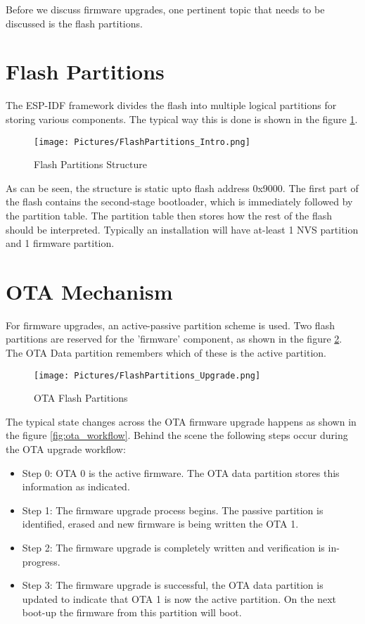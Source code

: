 \documentclass[main.tex]{subfiles}
\begin{document}
Before we discuss firmware upgrades, one pertinent topic that needs to be discussed is the flash partitions.

\section{Flash Partitions}
The ESP-IDF framework divides the flash into multiple logical partitions for storing various components. The typical way this is done is shown in the figure \ref{fig:flash_parts}.
\begin{figure}[h!]
    \centering
    \texttt{[image: Pictures/FlashPartitions\_Intro.png]}
    \caption{Flash Partitions Structure}
    \label{fig:flash_parts}
\end{figure}

As can be seen, the structure is static upto flash address 0x9000. The first part of the flash contains the second-stage bootloader, which is immediately followed by the partition table. The partition table then stores how the rest of the flash should be interpreted. Typically an installation will have at-least 1 NVS partition and 1 firmware partition.

\section{OTA Mechanism}
For firmware upgrades, an active-passive partition scheme is used. Two flash partitions are reserved for the 'firmware' component, as shown in the figure \ref{fig:ota_flash_parts}. The OTA Data partition remembers which of these is the active partition.

\begin{figure}[h!]
    \centering
    \texttt{[image: Pictures/FlashPartitions\_Upgrade.png]}
    \caption{OTA Flash Partitions}
    \label{fig:ota_flash_parts}
\end{figure}

The typical state changes across the OTA firmware upgrade happens as shown in the figure \ref{fig:ota_workflow}. Behind the scene the following steps occur during the OTA upgrade workflow:
\begin{itemize}
    \item Step 0: OTA 0 is the active firmware. The OTA data partition stores this information as indicated.
    \item Step 1: The firmware upgrade process begins. The passive partition is identified, erased and new firmware is being written the OTA 1.
    \item Step 2: The firmware upgrade is completely written and verification is in-progress.
    \item Step 3: The firmware upgrade is successful, the OTA data partition is updated to indicate that OTA 1 is now the active partition. On the next boot-up the firmware from this partition will boot.
\end{itemize}
\end{document}
